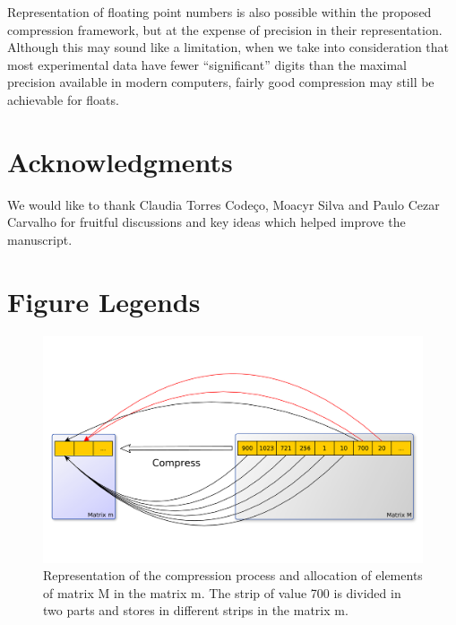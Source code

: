 \documentclass[10pt]{article}
\begin{document}
Representation of floating point numbers is also possible within the proposed compression framework, but at the expense 
of precision in their representation. Although this may sound like a limitation, when we take into consideration that 
most experimental data have fewer ``significant'' digits than the maximal precision available in modern computers, 
fairly good compression may still be achievable for floats. 



\section*{Acknowledgments}
We would like to thank Claudia Torres Code\c{c}o, Moacyr Silva and Paulo
Cezar Carvalho for fruitful discussions and key ideas which helped improve the
manuscript.



\section*{Figure Legends}

\begin{figure}[h]
  \includegraphics[scale=0.3,clip]{fig01}
  \caption{Representation of the compression process and allocation of 
elements of matrix M in the matrix m. The strip of value 700 is divided in two 
parts and stores in different strips in the matrix m.}
  \label{fig:01}
\end{figure}
\end{document}
